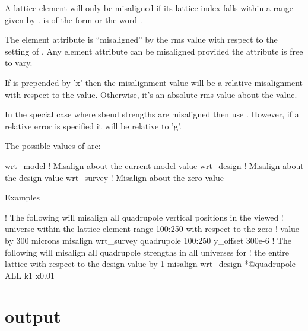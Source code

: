 A lattice element will only be misaligned if its lattice index falls within
a range given by .  is of the form
 or the word . 

The element attribute  is ``misaligned'' by the rms
value  with respect to the setting of
. Any element attribute can be misaligned provided the
attribute is free to vary.

If  is prepended by 'x' then the misalignment value will be
a relative misalignment with respect to the  value. Otherwise, it's an 
absolute rms value about the  value.

In the special case where sbend strengths are misaligned then use
. However, if a relative error is specified it will be 
relative to 'g'.

The possible values of  are:
\begin{example}
  wrt_model          ! Misalign about the current model value
  wrt_design         ! Misalign about the design value
  wrt_survey         ! Misalign about the zero value
\end{example}

Examples
\begin{example}
   ! The following will misalign all quadrupole vertical positions in the viewed
   ! universe within the lattice element range 100:250 with respect to the zero 
   ! value by 300 microns
  misalign wrt_survey quadrupole 100:250 y_offset 300e-6
   ! The following will misalign all quadrupole strengths in all universes for
   ! the entire lattice with respect to the design value by 1%
  misalign wrt_design *@quadrupole ALL k1 x0.01
\end{example}

\section{output}
\label{s:output}

